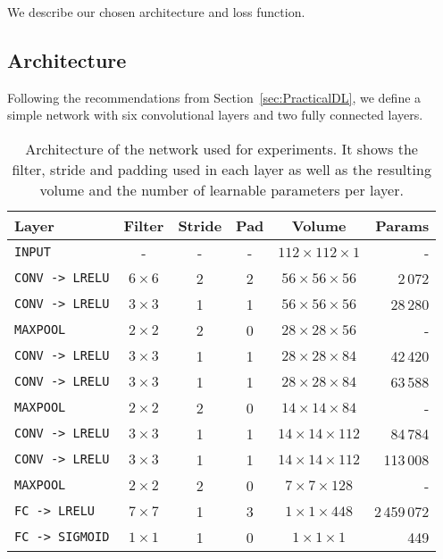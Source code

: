 We describe our chosen architecture and loss function.

\subsection{Architecture}
Following the recommendations from Section~\ref{sec:PracticalDL}, we define a simple network with six convolutional layers and two fully connected layers.

\begin{table}[h]
	\centering
	\begin{tabular}{lccccr}
	\hline
	\textbf{Layer} & \textbf{Filter} & \textbf{Stride} &\textbf{Pad} & \textbf{Volume} & \textbf{Params} \\
	\hline
	\texttt{INPUT}	& -	& - & - & $112 \times 112 \times 1$ & -\\
	\texttt{CONV -> LRELU} & $6 \times 6$ & 2 & 2 & $56 \times 56 \times 56$ & 2\,072\\
	\texttt{CONV -> LRELU} & $3 \times 3$ & 1 & 1 & $56 \times 56 \times 56$ & 28\,280\\
	\texttt{MAXPOOL} & $2 \times 2$ & 2 & 0 & $28 \times 28 \times 56$ & -\\
	\texttt{CONV -> LRELU} & $3 \times 3$ & 1 & 1 & $28 \times 28 \times 84$ & 42\,420\\
	\texttt{CONV -> LRELU} & $3 \times 3$ & 1 & 1 & $28 \times 28 \times 84$ & 63\,588\\
	\texttt{MAXPOOL} & $2 \times 2$ & 2 & 0 & $14 \times 14 \times 84$ & -\\
	\texttt{CONV -> LRELU} & $3 \times 3$ & 1 & 1 & $14 \times 14 \times 112$ & 84\,784\\
	\texttt{CONV -> LRELU} & $3 \times 3$ & 1 & 1 & $14 \times 14 \times 112$ & 113\,008\\
	\texttt{MAXPOOL} & $2 \times 2$ & 2 & 0 & $7 \times 7 \times 128$ & -\\
	\texttt{FC -> LRELU} & $7 \times 7$ & 1 & 3 & $1 \times 1 \times 448$ & 2\,459\,072\\
	\texttt{FC -> SIGMOID} & $1 \times 1$ & 1 & 0 & $1 \times 1 \times 1$ & 449 \\
	\hline
	\end{tabular}
	\label{tab:convNetArchitecture}
	\caption[Selected convolutional network architecture]{Architecture of the network used for experiments. It shows the filter, stride and padding used in each layer as well as the resulting volume and the number of learnable parameters per layer.}
\end{table}

